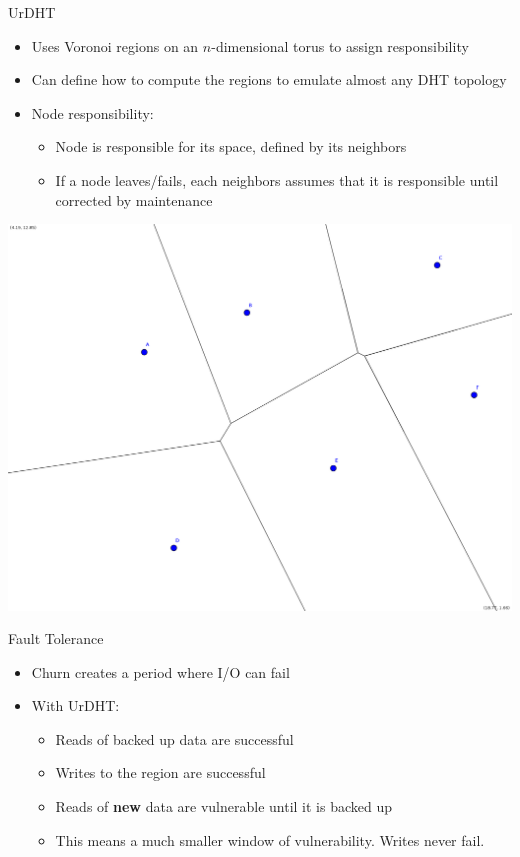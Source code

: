 \documentclass[11pt]{beamer}
\begin{document}
\begin{frame}{UrDHT}
	\begin{itemize}
		\item Uses Voronoi regions on an $n$-dimensional torus to assign responsibility
		\item Can define how to compute the regions to emulate almost any DHT topology
		\item Node responsibility:
		\begin{itemize}
			\item Node is responsible for its space, defined by its neighbors
			\item If a node leaves/fails, each neighbors assumes that it is responsible until corrected by maintenance 
		\end{itemize}
	\end{itemize}
	
\begin{center}
\includegraphics[width=0.5\linewidth]{figs/new_voronoi}
\end{center}


\end{frame}

\begin{frame}{Fault Tolerance}
	\begin{itemize}
		\item Churn creates a period where I/O can fail
		\item With UrDHT:
		\begin{itemize}
			\item Reads of backed up data are successful
			\item Writes to the region are successful
			\item Reads of \textbf{new} data are vulnerable until it is backed up
			\item This means a much smaller window of vulnerability.  Writes never fail.%
		\end{itemize}
	\end{itemize}

\end{frame}
\end{document}
